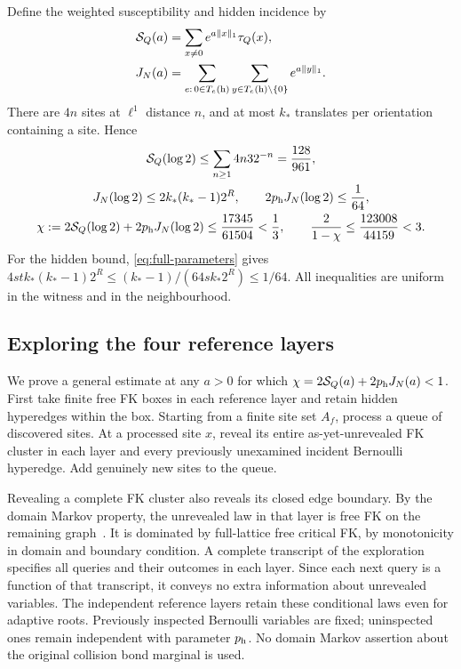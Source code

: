 Define the weighted susceptibility and hidden incidence by
\begin{align}
 \mathcal S_Q(a)&=\sum_{x\ne0}e^{a\|x\|_1}\tau_Q(x),\label{eq:weighted-S}\\
 J_N(a)&=\sum_{e:\,0\in T_e({\rm h})}
             \sum_{y\in T_e({\rm h})\setminus\{0\}}e^{a\|y\|_1}.
 \label{eq:weighted-J}
\end{align}
There are $4n$ sites at $\ell^1$ distance $n$, and at most $k_*$ translates per orientation containing a site. Hence
\begin{equation}\label{eq:exploration-constants}
 \begin{gathered}
 \mathcal S_Q(\log2)\le\sum_{n\ge1}4n32^{-n}=\frac{128}{961},\\
 J_N(\log2)\le2k_*(k_*-1)2^R,\qquad
 2p_{\rm h}J_N(\log2)\le\frac1{64},\\
 \chi:=2\mathcal S_Q(\log2)+2p_{\rm h}J_N(\log2)
 \le\frac{17345}{61504}<\frac13,\qquad
 \frac2{1-\chi}\le\frac{123008}{44159}<3.
 \end{gathered}
\end{equation}
For the hidden bound, \eqref{eq:full-parameters} gives
$4st k_*(k_*-1)2^R\le(k_*-1)/(64s k_*2^R)\le1/64$.
All inequalities are uniform in the witness and in the neighbourhood.

\subsection{Exploring the four reference layers}\label{sec:full-exploration}
We prove a general estimate at any $a>0$ for which
$\chi=2\mathcal S_Q(a)+2p_{\rm h}J_N(a)<1$.
First take finite free FK boxes in each reference layer and retain hidden hyperedges within the box. Starting from a finite site set $A_f$, process a queue of discovered sites. At a processed site $x$, reveal its entire as-yet-unrevealed FK cluster in each layer and every previously unexamined incident Bernoulli hyperedge. Add genuinely new sites to the queue.

Revealing a complete FK cluster also reveals its closed edge boundary. By the domain Markov property, the unrevealed law in that layer is free FK on the remaining graph~\cite[Lemmas 4.13--4.14]{Grimmett}. It is dominated by full-lattice free critical FK, by monotonicity in domain and boundary condition. A complete transcript of the exploration specifies all queries and their outcomes in each layer. Since each next query is a function of that transcript, it conveys no extra information about unrevealed variables. The independent reference layers retain these conditional laws even for adaptive roots. Previously inspected Bernoulli variables are fixed; uninspected ones remain independent with parameter $p_{\rm h}$. No domain Markov assertion about the original collision bond marginal is used.

